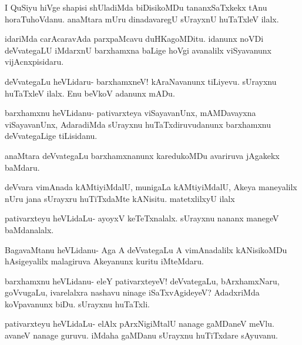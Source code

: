 \documentclass{article}
\begin{document}
\begin{mng}%
I QuSiyu hiVge shapisi shUladiMda biDisikoMDu tananxSaTxkekx
tAnu horaTuhoVdanu. anaMtara mUru dinadavaregU sUrayxnU huTaTxleV
ilalx.
\end{mng}

\begin{mng}%
idariMda carAcaravAda parxpaMcavu duHKagoMDitu. idanunx
noVDi deVvategaLU iMdarxnU barxhamxna baLige hoVgi avanalilx viSyavanunx
vijAcnxpisidaru.
\end{mng}

\begin{mng}%
deVvategaLu heVLidaru- barxhamxneV! kAraNavanunx tiLiyevu.
sUrayxnu huTaTxleV ilalx. Enu beVkoV adanunx mADu.
\end{mng}

\begin{mng}%
barxhamxnu heVLidanu- pativarxteya viSayavanUnx, mAMDavayxna
viSayavanUnx, AdaradiMda sUrayxnu huTaTxdiruvudanunx barxhamxnu deVvategaLige
tiLisidanu.
\end{mng}

\begin{mng}%
anaMtara deVvategaLu barxhamxnanunx karedukoMDu avariruva
jAgakekx baMdaru.
\end{mng}

\begin{mng}%
deVvara vimAnada kAMtiyiMdalU, munigaLa kAMtiyiMdalU,
Akeya maneyalilx nUru jana sUrayxru huTiTxdaMte kANisitu. matetxlilxyU
ilalx
\end{mng}

\begin{mng}%
pativarxteyu heVLidaLu- ayoyxV keTeTxnalalx. sUrayxnu nananx
manegeV baMdanalalx.
\end{mng}

\begin{mng}%
BagavaMtanu heVLidanu- Aga A deVvategaLu A vimAnadalilx
kANisikoMDu hAsigeyalilx malagiruva Akeyanunx kuritu iMteMdaru.
\end{mng}

\begin{mng}%
barxhamxnu heVLidanu- eleY pativarxteyeV! deVvategaLu,
bArxhamxNaru, goVvugaLu, ivarelalxra nashavu ninage iSaTxvAgideyeV?
AdadxriMda koVpavanunx biDu. sUrayxnu huTaTxli.
\end{mng}

\begin{mng}%
pativarxteyu heVLidaLu- elAlx pArxNigiMtalU nanage gaMDaneV
meVlu. avaneV nanage guruvu. iMdaha gaMDanu sUrayxnu huTiTxdare
sAyuvanu.
\end{mng}
\end{document}
